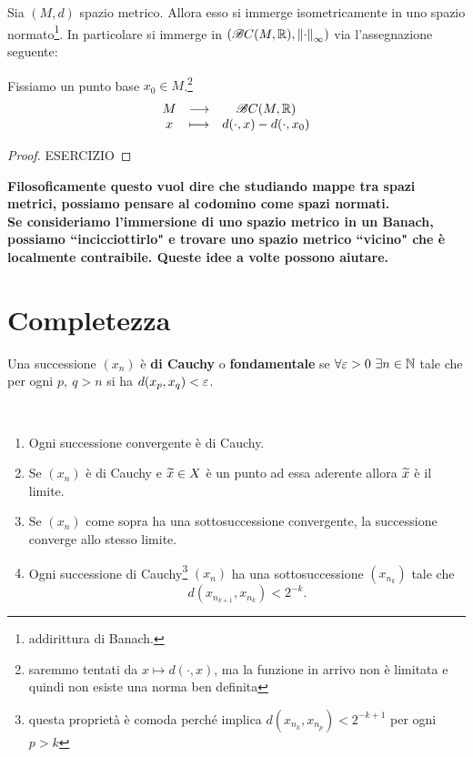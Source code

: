 \begin{theorem}\label{ThInclusioneIsometricaFrechetKuratowski}
Sia $(M,d)$ spazio metrico. Allora esso si immerge isometricamente in uno spazio normato\footnote{addirittura di Banach.}. In particolare si immerge in $(\mathscr{B} C(M,\mathbb{R}),\left\Vert{\cdot}\right\Vert_\infty)$ via l'assegnazione seguente:

Fissiamo un punto base $x_0\in M$.\footnote{saremmo tentati da $x\mapsto d(\cdot,x)$, ma la funzione in arrivo non \`e limitata e quindi non esiste una norma ben definita}
\[\begin{array}{ccc} {M} & \longrightarrow & {\mathscr{B} C(M,\mathbb{R})}\\ {x} & \longmapsto & {d(\cdot,x)-d(\cdot,x_0)} \end{array}\]
\end{theorem}
\begin{proof}
ESERCIZIO
\end{proof}

\begin{center}
\textbf{Filosoficamente questo vuol dire che studiando mappe tra spazi metrici, possiamo pensare al codomino come spazi normati.\\
Se consideriamo l'immersione di uno spazio metrico in un Banach, possiamo ``incicciottirlo" e trovare uno spazio metrico ``vicino" che \`e localmente contraibile. Queste idee a volte possono aiutare.}
\end{center}


\section{Completezza}
\begin{definition}
Una successione $(x_n)$ \`e \textbf{di Cauchy} o \textbf{fondamentale} se $\forall \varepsilon>0\ \exists n\in\mathbb{N}$ tale che per ogni $p,\ q>n$ si ha $d(x_p,x_q)<\varepsilon$.
\end{definition}
\begin{fact}
    ~
\begin{enumerate}
    \item Ogni successione convergente \`e di Cauchy.
    \item Se $(x_n)$ \`e di Cauchy e $\widetilde{x}\in X$ \`e un punto ad essa aderente allora $\widetilde{x}$ \`e il limite.
    \item Se $(x_n)$ come sopra ha una sottosuccessione convergente, la successione converge allo stesso limite.
    \item Ogni successione di Cauchy\footnote{questa propriet\`a \`e comoda perch\'e implica $d(x_{n_k},x_{n_p})<2^{-k+1}$ per ogni $p>k$} $(x_n)$ ha una sottosuccessione $(x_{n_k})$ tale che 
    \[d(x_{n_{k+1}},x_{n_{k}})<2^{-k}.\]
\end{enumerate}
\end{fact}

